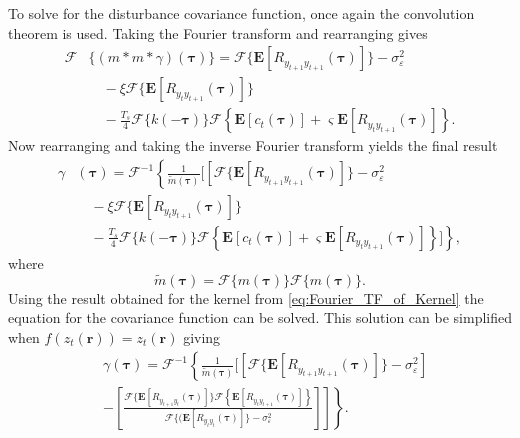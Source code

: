 \documentclass[10pt,twocolumn,twoside]{IEEEtran}
\begin{document}
To solve for the disturbance covariance function, once again the convolution theorem is used.
Taking the Fourier transform and rearranging gives
\begin{align}
	\mathcal{F}&\{(m\ast m \ast \gamma)(\boldsymbol\tau)\} = \mathcal{F}\{\mathbf{E}[R_{y_{t+1}y_{t+1}}(\boldsymbol{\tau})]\}-\sigma_{\varepsilon}^2 \nonumber \\ 
	&\quad-\xi \mathcal{F}\{\mathbf{E}[R_{y_ty_{t+1}}(\boldsymbol{\tau})]\} \nonumber \\
	&\quad - \frac{T_s}{4} \mathcal{F}\{k(-\boldsymbol\tau)\}\mathcal{F}\left\{\mathbf{E}\left[c_t(\boldsymbol\tau)\right] + \varsigma \mathbf{E}\left[R_{y_ty_{t+1}}(\boldsymbol\tau)\right] \right\}.
\end{align}
Now rearranging and taking the inverse Fourier transform yields the final result 
 \begin{align}\label{eq:EM-MMGFourier2}   
	\gamma&(\boldsymbol\tau) =\mathcal{F}^{-1}\left\lbrace\frac{1}{\tilde{m}(\boldsymbol\tau)}\Bigg[\left[ \mathcal{F}\{\mathbf{E}[R_{y_{t+1}y_{t+1}}(\boldsymbol{\tau})]\}-\sigma_{\varepsilon}^2  \nonumber \right.
\right.
\\ 
	&\quad-\xi \mathcal{F}\{\mathbf{E}[R_{y_ty_{t+1}}(\boldsymbol{\tau})]\} \nonumber \\
	&\left.\quad - \frac{T_s}{4} \mathcal{F}\{k(-\boldsymbol\tau)\}\mathcal{F}\left\{\mathbf{E}\left[c_t(\boldsymbol\tau)\right] + \varsigma \mathbf{E}\left[R_{y_ty_{t+1}}(\boldsymbol\tau)\right] \right\}\Bigg]\right\rbrace,
\end{align}
where
\begin{equation}
 \tilde{m}(\boldsymbol\tau)=\mathcal{F}\{m(\boldsymbol\tau)\}\mathcal{F}\{m(\boldsymbol\tau)\}.
\end{equation}
Using the result obtained for the kernel from  \eqref{eq:Fourier_TF_of_Kernel}  the equation for the covariance function can be solved.
This solution can be simplified when $f(z_t(\mathbf{r}))=z_t(\mathbf{r})$ giving
\begin{align}\label{eq:DiffusionDisturbanceSolution}
	&\gamma(\boldsymbol\tau) =\mathcal{F}^{-1}\left\lbrace \frac{1}{\tilde{m}(\boldsymbol\tau)}\Bigg[\left[\mathcal{F}\{\mathbf{E}[R_{y_{t+1}y_{t+1}}(\boldsymbol{\tau})]\}-\sigma_{\varepsilon}^2\right] \nonumber \right.\\
 &\left.
\left.- \left[\frac{\mathcal{F}\{\mathbf{E}[R_{y_{t+1}y_t}(\boldsymbol{\tau})]\}\mathcal{F}\left\{\mathbf{E}\left[R_{y_ty_{t+1}}(\boldsymbol\tau)\right] \right\}}{\mathcal{F}\{(\mathbf{E}\left[R_{y_ty_t}(\boldsymbol\tau)\right]\} - \sigma_{\varepsilon}^2}\right]\right]\right\rbrace.
\end{align}
\end{document}
